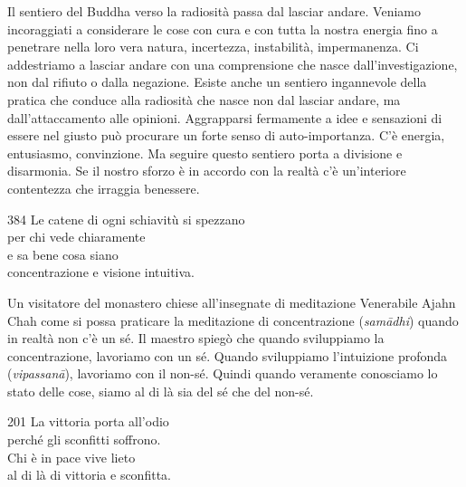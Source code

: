 \begin{dhpRefl}
Il sentiero del Buddha verso la radiosit\`{a} passa dal lasciar andare. Veniamo incoraggiati a considerare le cose con cura e con tutta la nostra energia fino a penetrare nella loro vera natura, incertezza, instabilit\`{a}, impermanenza. Ci addestriamo a lasciar andare con una comprensione che nasce dall'investigazione, non dal rifiuto o dalla negazione. Esiste anche un sentiero ingannevole della pratica che conduce alla radiosit\`{a} che nasce non dal lasciar andare, ma dall'attaccamento alle opinioni. Aggrapparsi fermamente a idee e sensazioni di essere nel giusto pu\`{o} procurare un forte senso di auto-importanza. C'\`{e} energia, entusiasmo, convinzione. Ma seguire questo sentiero porta a divisione e disarmonia. Se il nostro sforzo \`{e} in accordo con la realt\`{a} c'\`{e} un'interiore contentezza che irraggia benessere.
\end{dhpRefl}


\begin{dhpVerse}{384}
\label{dhp-384}
Le catene di ogni schiavitù si spezzano\\
per chi vede chiaramente\\
e sa bene cosa  siano\\
concentrazione e visione intuitiva.
\end{dhpVerse}

\begin{dhpRefl}
  Un visitatore del monastero chiese all'insegnate di meditazione Venerabile Ajahn Chah come si possa praticare la meditazione di concentrazione (\emph{samādhi}) quando in realt\`{a} non c'\`{e} un s\'{e}. Il maestro spieg\`{o} che quando sviluppiamo la concentrazione, lavoriamo con un s\'{e}. Quando sviluppiamo l'intuizione profonda (\emph{vipassanā}), lavoriamo con il non-s\'{e}. Quindi quando veramente conosciamo lo stato delle cose, siamo al di l\`{a} sia del s\'{e} che del non-s\'{e}. 
\end{dhpRefl}


\begin{dhpVerse}{201}
\label{dhp-201}
La vittoria porta all'odio\\
perch\'{e} gli sconfitti soffrono.\\
Chi \`{e} in pace vive lieto\\
al di l\`{a} di vittoria e sconfitta.
\end{dhpVerse}

